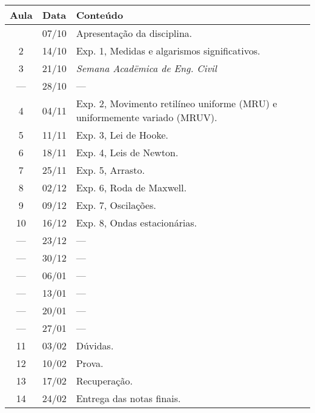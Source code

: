 \begin{center}
\begin{longtable}{ccp{70mm}}
\toprule
Aula & Data & Conteúdo \\
\midrule
\endhead
\bottomrule
\endfoot
  1 & 07/10 & Apresentação da disciplina. \\
  2 & 14/10 & Exp. 1, Medidas e algarismos significativos. \\
  3 & 21/10 & \emph{Semana Acadëmica de Eng. Civil} \\
--- & 28/10 & --- \\
  4 & 04/11 & Exp. 2, Movimento retilíneo uniforme (MRU) e uniformemente variado (MRUV). \\
  5 & 11/11 & Exp. 3, Lei de Hooke. \\
  6 & 18/11 & Exp. 4, Leis de Newton. \\
  7 & 25/11 & Exp. 5, Arrasto. \\
  8 & 02/12 & Exp. 6, Roda de Maxwell. \\
  9 & 09/12 & Exp. 7, Oscilações. \\
 10 & 16/12 & Exp. 8, Ondas estacionárias. \\
--- & 23/12 & --- \\
--- & 30/12 & --- \\
--- & 06/01 & --- \\
--- & 13/01 & --- \\
--- & 20/01 & --- \\ 
--- & 27/01 & --- \\
 11 & 03/02 & Dúvidas. \\
 12 & 10/02 & Prova.\\
 13 & 17/02 & Recuperação.\\
 14 & 24/02 & Entrega das notas finais.
\end{longtable}
\end{center}
\cleardoublepage
